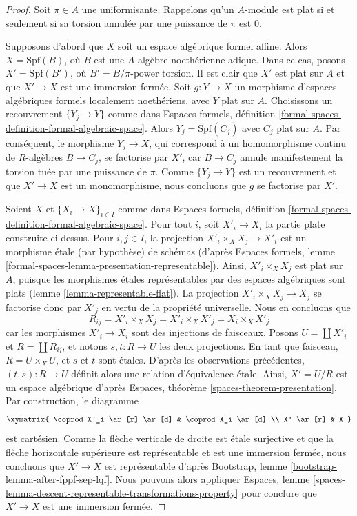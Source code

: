 \begin{proof}
Soit $\pi \in A$ une uniformisante. Rappelons qu'un $A$-module
est plat si et seulement si sa torsion annulée par une puissance de $\pi$ est $0$.

\medskip\noindent
Supposons d'abord que $X$ soit un espace algébrique formel affine.
Alors $X = \text{Spf}(B)$, où $B$ est une $A$-algèbre noethérienne adique.
Dans ce cas, posons $X' = \text{Spf}(B')$, où
$B' = B/\pi\text{-power torsion}$. Il est clair que $X'$ est plat
sur $A$ et que $X' \to X$ est une immersion fermée.
Soit $g : Y \to X$ un morphisme d'espaces algébriques formels localement
noethériens, avec $Y$ plat sur $A$. Choisissons un recouvrement
$\{Y_j \to Y\}$ comme dans Espaces formels, définition
\ref{formal-spaces-definition-formal-algebraic-space}.
Alors $Y_j = \text{Spf}(C_j)$ avec $C_j$ plat sur $A$.
Par conséquent, le morphisme $Y_j \to X$, qui correspond à un homomorphisme
continu de $R$-algèbres $B \to C_j$, se factorise par $X'$, car
$B \to C_j$ annule manifestement la torsion tuée par une puissance de $\pi$.
Comme $\{Y_j \to Y\}$ est un recouvrement et que $X' \to X$
est un monomorphisme, nous concluons que $g$ se factorise par $X'$.

\medskip\noindent
Soient $X$ et $\{X_i \to X\}_{i \in I}$ comme dans
Espaces formels, définition
\ref{formal-spaces-definition-formal-algebraic-space}.
Pour tout $i$, soit $X'_i \to X_i$ la partie plate construite
ci-dessus. Pour $i, j \in I$, la projection
$X'_i \times_X X_j \to X'_i$ est un morphisme étale (par hypothèse)
de schémas (d'après Espaces formels, lemme
\ref{formal-spaces-lemma-presentation-representable}).
Ainsi, $X'_i \times_X X_j$ est plat sur $A$, puisque les morphismes
étales représentables par des espaces algébriques sont plats
(lemme \ref{lemma-representable-flat}).
La projection $X'_i \times_X X_j \to X_j$ se factorise donc
par $X'_j$ en vertu de la propriété universelle. Nous en concluons que
$$
R_{ij} = X'_i \times_X X_j = X'_i \times_X X'_j = X_i \times_X X'_j
$$
car les morphismes $X'_i \to X_i$ sont des injections de faisceaux.
Posons $U = \coprod X'_i$ et
$R = \coprod R_{ij}$, et notons $s, t : R \to U$ les deux
projections. En tant que faisceau, $R = U \times_X U$, et $s$ et $t$
sont étales. D'après les observations précédentes, $(t, s) : R \to U$
définit alors une relation d'équivalence étale. Ainsi, $X' = U/R$ est un
espace algébrique d'après Espaces, théorème \ref{spaces-theorem-presentation}.
Par construction, le diagramme
$$
\xymatrix{
\coprod X'_i \ar[r] \ar[d] & \coprod X_i \ar[d] \\
X' \ar[r] & X
}
$$
est cartésien. Comme la flèche verticale de droite est étale surjective
et que la flèche horizontale supérieure est représentable et est une immersion
fermée, nous concluons que $X' \to X$ est représentable d'après
Bootstrap, lemme \ref{bootstrap-lemma-after-fppf-sep-lqf}.
Nous pouvons alors appliquer Espaces, lemme
\ref{spaces-lemma-descent-representable-transformations-property}
pour conclure que $X' \to X$ est une immersion fermée.


\end{proof}
